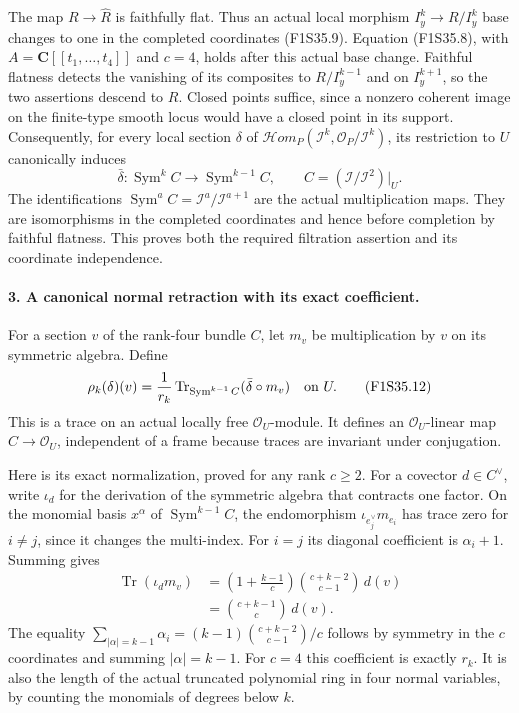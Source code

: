 The map $R\to\widehat R$ is faithfully flat.
Thus an actual local morphism
$I_y^k\to R/I_y^k$ base changes to one in
the completed coordinates (F1S35.9).
Equation (F1S35.8), with
$A=\mathbf C[[t_1,\ldots,t_4]]$ and $c=4$,
holds after this actual base change.
Faithful flatness detects the vanishing of its
composites to $R/I_y^{k-1}$ and on $I_y^{k+1}$,
so the two assertions descend to $R$.
Closed points suffice, since a nonzero coherent
image on the finite-type smooth locus would
have a closed point in its support.
Consequently, for every local section
$\delta$ of $\mathcal Hom_P(\mathcal I^k,
\mathcal O_P/\mathcal I^k)$, its restriction
to $U$ canonically induces
\[
 \bar\delta:
 \operatorname{Sym}^k C\longrightarrow
                   \operatorname{Sym}^{k-1}C,
 \qquad C=(\mathcal I/\mathcal I^2)|_U.
 \tag{F1S35.11}
\]
The identifications
$\operatorname{Sym}^a C=\mathcal I^a/\mathcal I^{a+1}$
are the actual multiplication maps. They are
isomorphisms in the completed coordinates and
hence before completion by faithful flatness.
This proves both the required filtration
assertion and its coordinate independence.

\paragraph{3. A canonical normal retraction with its exact coefficient.}
For a section $v$ of the rank-four bundle $C$,
let $m_v$ be multiplication by $v$ on its
symmetric algebra. Define
\[
 \rho_k(\delta)(v)
       =\frac{1}{r_k}
          \operatorname{Tr}_{\operatorname{Sym}^{k-1}C}
                         (\bar\delta\circ m_v)
                    \quad\hbox{on }U.
 \tag{F1S35.12}
\]
This is a trace on an actual locally free
$\mathcal O_U$-module. It defines an
$\mathcal O_U$-linear map $C\to\mathcal O_U$,
independent of a frame because traces are
invariant under conjugation.

Here is its exact normalization, proved for
any rank $c\ge2$. For a covector $d\in C^\vee$,
write $\iota_d$ for the derivation of the
symmetric algebra that contracts one factor.
On the monomial basis $x^\alpha$ of
$\operatorname{Sym}^{k-1}C$, the endomorphism
$\iota_{e_j^\vee}m_{e_i}$ has trace zero for
$i\ne j$, since it changes the multi-index.
For $i=j$ its diagonal coefficient is
$\alpha_i+1$. Summing gives
\[
\begin{split}
 \operatorname{Tr}(\iota_d m_v)
  &=\left(1+\frac{k-1}{c}\right)
          \binom{c+k-2}{c-1}\,d(v)\\
  &=\binom{c+k-1}{c}\,d(v).
\end{split}
 \tag{F1S35.13}
\]
The equality
$\sum_{|\alpha|=k-1}\alpha_i
 =(k-1)\binom{c+k-2}{c-1}/c$
follows by symmetry in the $c$ coordinates
and summing $|\alpha|=k-1$.
For $c=4$ this coefficient is exactly $r_k$.
It is also the length of the actual truncated
polynomial ring in four normal variables,
by counting the monomials of degrees below $k$.

